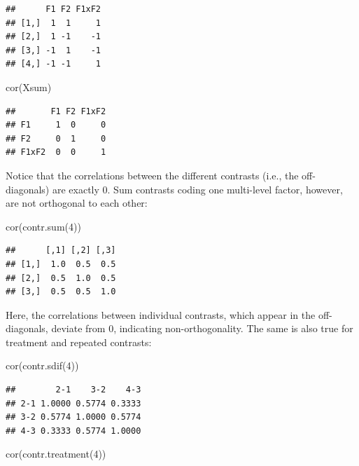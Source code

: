 \documentclass[
  12pt,
]{krantz}
\newenvironment{Shaded}{\begin{snugshade}}{\end{snugshade}}
\newcommand{\DecValTok}[1]{\textcolor[rgb]{0.00,0.00,0.81}{#1}}
\newcommand{\FunctionTok}[1]{\textcolor[rgb]{0.00,0.00,0.00}{#1}}
\newcommand{\NormalTok}[1]{#1}
\theoremstyle{definition}
\theoremstyle{definition}
\theoremstyle{definition}
\theoremstyle{definition}
\theoremstyle{remark}
\begin{document}
\begin{verbatim}
##      F1 F2 F1xF2
## [1,]  1  1     1
## [2,]  1 -1    -1
## [3,] -1  1    -1
## [4,] -1 -1     1
\end{verbatim}

\begin{Shaded}
\begin{Highlighting}[]
\FunctionTok{cor}\NormalTok{(Xsum)}
\end{Highlighting}
\end{Shaded}

\begin{verbatim}
##       F1 F2 F1xF2
## F1     1  0     0
## F2     0  1     0
## F1xF2  0  0     1
\end{verbatim}

\noindent
Notice that the correlations between the different contrasts (i.e., the off-diagonals) are exactly \(0\). Sum contrasts coding one multi-level factor, however, are not orthogonal to each other:

\begin{Shaded}
\begin{Highlighting}[]
\FunctionTok{cor}\NormalTok{(}\FunctionTok{contr.sum}\NormalTok{(}\DecValTok{4}\NormalTok{))}
\end{Highlighting}
\end{Shaded}

\begin{verbatim}
##      [,1] [,2] [,3]
## [1,]  1.0  0.5  0.5
## [2,]  0.5  1.0  0.5
## [3,]  0.5  0.5  1.0
\end{verbatim}

\noindent
Here, the correlations between individual contrasts, which appear in the off-diagonals, deviate from \(0\), indicating non-orthogonality. The same is also true for treatment and repeated contrasts:

\begin{Shaded}
\begin{Highlighting}[]
\FunctionTok{cor}\NormalTok{(}\FunctionTok{contr.sdif}\NormalTok{(}\DecValTok{4}\NormalTok{))}
\end{Highlighting}
\end{Shaded}

\begin{verbatim}
##        2-1    3-2    4-3
## 2-1 1.0000 0.5774 0.3333
## 3-2 0.5774 1.0000 0.5774
## 4-3 0.3333 0.5774 1.0000
\end{verbatim}

\begin{Shaded}
\begin{Highlighting}[]
\FunctionTok{cor}\NormalTok{(}\FunctionTok{contr.treatment}\NormalTok{(}\DecValTok{4}\NormalTok{))}
\end{Highlighting}
\end{Shaded}
\end{document}
